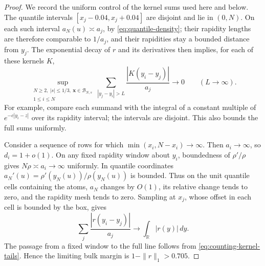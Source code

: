 \begin{proof}
We record the uniform control of the kernel sums used here and below. The quantile intervals
\([x_j-0.04,x_j+0.04]\) are disjoint and lie in \((0,N)\). On each such interval \(a_N(u)\asymp a_j\), by \eqref{eq:quantile-density}; their rapidity lengths are therefore comparable to \(1/a_j\), and their rapidities stay a bounded distance from \(y_j\). The exponential decay of \(r\) and its derivatives then implies, for each of these kernels \(K\),
\begin{equation}\label{eq:counting-kernel-tails}
 \sup_{\substack{N\ge2,\ |s|\le1/3,\ \boldsymbol x\in\mathcal B_{N,s}\\1\le i\le N}}
 \sum_{|y_j-y_i|>L}\frac{|K(y_i-y_j)|}{a_j}
 \longrightarrow0\qquad(L\longrightarrow\infty).
\end{equation}
For example, compare each summand with the integral of a constant multiple of \(e^{-c|y_i-z|}\) over its rapidity interval; the intervals are disjoint. This also bounds the full sums uniformly.

Consider a sequence of rows for which \(\min(x_i,N-x_i)\to\infty\). Then \(a_i\to\infty\), so \(d_i=1+o(1)\). On any fixed rapidity window about \(y_i\), boundedness of \(\rho'/\rho\) gives \(N\rho\asymp a_i\to\infty\) uniformly. In quantile coordinates \(a_N'(u)=\rho'(y_N(u))/\rho(y_N(u))\) is bounded. Thus on the unit quantile cells containing the atoms, \(a_N\) changes by \(O(1)\), its relative change tends to zero, and the rapidity mesh tends to zero. Sampling at \(x_j\), whose offset in each cell is bounded by the box, gives
\[
 \sum_j\frac{|r(y_i-y_j)|}{a_j}\longrightarrow\int_{\mathbb R}|r(y)|\,dy.
\]
The passage from a fixed window to the full line follows from
\eqref{eq:counting-kernel-tails}. Hence the limiting bulk margin is
\(1-\|r\|_1>0.705\).


\end{proof}
